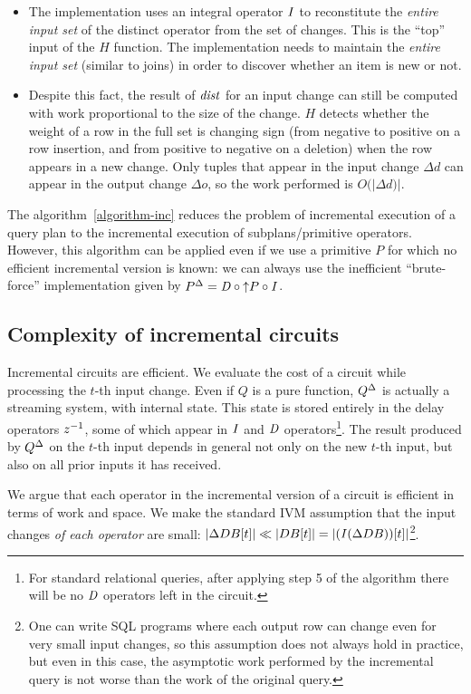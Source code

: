 \begin{itemize}
  \item The implementation uses an integral operator $\mathit{I}$ to
    reconstitute the \emph{entire input set} of the distinct operator
    from the set of changes.  This is the ``top'' input of the $H$
    function.  The implementation needs to maintain the \emph{entire
    input set} (similar to joins) in order to discover whether an item
    is new or not.
  \item Despite this fact, the result of $\mathit{dist}$ for an input
    change can still be computed with work proportional to the size of
    the change.  $H$ detects whether the weight of a row in the full
    set is changing sign (from negative to positive on a row
    insertion, and from positive to negative on a deletion) when the
    row appears in a new change.  Only tuples that appear in
    the input change $\Delta d$ can appear in the output change
    $\Delta o$, so the work performed is $O(|\Delta d)|$.
\end{itemize}

The algorithm~\ref{algorithm-inc} reduces the problem of incremental
execution of a query plan to the incremental execution of
sub\-plans/primitive operators.  However, this algorithm can be
applied even if we use a primitive $P$ for which no efficient
incremental version is known: we can always use the inefficient
``brute-force'' implementation given by ${P}^{\Delta} = \mathit{D} \circ {\uparrow}P
\circ \mathit{I}$.



\subsection{Complexity of incremental circuits}\label{sec:complexity}

Incremental circuits are efficient.  We evaluate the cost of a circuit
while processing the $t$-th input change.  Even if $Q$ is a pure
function, ${Q}^{\Delta}$ is actually a streaming system, with internal
state.  This state is stored entirely in the delay operators $z^{-1}$,
some of which appear in $\mathit{I}$ and $\mathit{D}$ operators\footnote{For 
standard relational queries, after applying step 5 of the algorithm
there will be no $\mathit{D}$ operators left in the circuit.}.  The result
produced by ${Q}^{\Delta}$ on the $t$-th input depends in general not only
on the new $t$-th input, but also on all prior inputs it has received.

We argue that each operator in the incremental version of a circuit is
efficient in terms of work and space.  We make the standard IVM
assumption that the input changes \emph{of each operator} are small:
$|\Delta DB[t]| \ll |DB[t]| = |(\mathit{I}(\Delta DB))[t]|$\footnote{One can
write SQL programs where each output row can change even for very
small input changes, so this assumption does not always hold in
practice, but even in this case, the asymptotic work performed by the
incremental query is not worse than the work of the original query.}.


